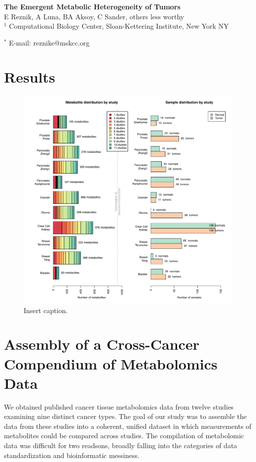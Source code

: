 \documentclass[10pt]{article}
\date{}
\begin{document}
\begin{flushleft}
{\Large
\textbf{The Emergent Metabolic Heterogeneity of Tumors}
}
\\
E Reznik, A Luna, BA Aksoy, C Sander, others less worthy
\\
$^1$ Computational Biology Center, Sloan-Kettering Institute, New York NY

$^\ast$ E-mail: reznike@mskcc.org
\end{flushleft}

\begin{abstract}
\end{abstract}


\section{Results}

\begin{figure}[ht!]
  \centering
     \includegraphics[scale = 0.5]{figures/Figure1/Figure1.pdf}
  \caption{Insert caption. }
     \label{fig:Fig1}
\end{figure}

\section{Assembly of a Cross-Cancer Compendium of Metabolomics Data}
We obtained published cancer tissue metabolomics data from twelve studies examining nine distinct cancer types. The goal of our study was to assemble the data from these studies into a coherent, unified dataset in which measurements of metabolites could be compared across studies. The compilation of metabolomic data was difficult for two readsons, broadly falling into the categories of data standardization and bioinformatic messiness.
\end{document}
